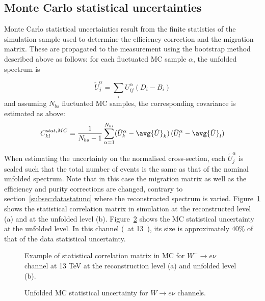 \subsection{Monte Carlo statistical uncertainties}

Monte Carlo statistical uncertainties result from the finite statistics of the simulation sample used to determine the efficiency correction and the migration matrix. These are propagated to the measurement using the bootstrap method described above as follows: for each fluctuated MC sample $\alpha$, the unfolded spectrum is

\begin{equation}
\tilde{U}_j^\alpha =  \sum_{i} U_{ij}^\alpha (D_i - B_i)
\end{equation}
\noindent and assuming $N_{bs}$ fluctuated MC samples, the corresponding covariance is estimated as above:
\begin{equation}
C_{kl}^{\textrm stat,MC} = \frac{1}{N_{bs}-1} \sum_{\alpha=1}^{N_{bs}} (\tilde{U}^\alpha_k-\avg{\tilde{U}}_k) \, (\tilde{U}^\alpha_l-\avg{\tilde{U}}_l)
\end{equation}

When estimating the uncertainty on the normalised cross-section, each $\tilde{U}_j^\alpha$ is scaled such that the total number of events is the same as that of the nominal unfolded spectrum.
Note that in this case the migration matrix as well as the efficiency and purity corrections are changed, contrary to section~\ref{subsec:datastatunc} where the reconstructed spectrum is varied.
Figure~\ref{fig:corrStatMC} shows the statistical correlation matrix in simulation at the reconstructed level (a) and at the unfolded level (b). Figure~\ref{fig:unfMCStat} shows the MC statistical uncertainty at the unfolded level. In this channel (\Wmenu\ at 13~\TeV), its size is approximately 40\% of that of the data statistical uncertainty. 

\begin{figure}[h]
  \centering
  \caption{ Example of statistical correlation matrix in MC for $W^{-}\rightarrow e\nu$ channel at 13 TeV at the reconstruction level (a) and unfolded level (b).}
  \label{fig:corrStatMC}
\end{figure}

\begin{figure}[h]
  \centering
  
  \caption{Unfolded MC statistical uncertainty for $W\rightarrow e\nu$ channels.}
  \label{fig:unfMCStat}
\end{figure}


